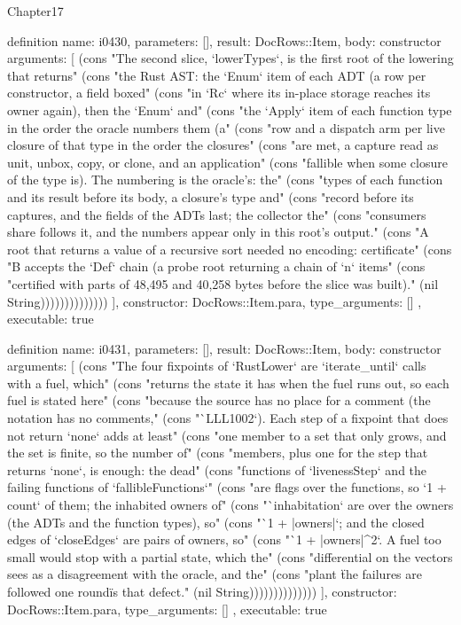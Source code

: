 \begin{lexlean}{Chapter17}
\begin{semanticmodule}
definition{
  name: i0430,
  parameters: [],
  result: DocRows::Item,
  body: constructor{
    arguments: [
      (cons "The second slice, `lowerTypes`, is the first root of the lowering that returns" (cons "the Rust AST: the `Enum` item of each ADT (a row per constructor, a field boxed" (cons "in `Rc` where its in-place storage reaches its owner again), then the `Enum` and" (cons "the `Apply` item of each function type in the order the oracle numbers them (a" (cons "row and a dispatch arm per live closure of that type in the order the closures" (cons "are met, a capture read as unit, unbox, copy, or clone, and an application" (cons "fallible when some closure of the type is). The numbering is the oracle's: the" (cons "types of each function and its result before its body, a closure's type and" (cons "record before its captures, and the fields of the ADTs last; the collector the" (cons "consumers share follows it, and the numbers appear only in this root's output." (cons "A root that returns a value of a recursive sort needed no encoding: certificate" (cons "B accepts the `Def` chain (a probe root returning a chain of `n` items" (cons "certified with parts of 48,495 and 40,258 bytes before the slice was built)." (nil String))))))))))))))
    ],
    constructor: DocRows::Item.para,
    type_arguments: []
  },
  executable: true
}

definition{
  name: i0431,
  parameters: [],
  result: DocRows::Item,
  body: constructor{
    arguments: [
      (cons "The four fixpoints of `RustLower` are `iterate_until` calls with a fuel, which" (cons "returns the state it has when the fuel runs out, so each fuel is stated here" (cons "because the source has no place for a comment (the notation has no comments," (cons "`LLL1002`). Each step of a fixpoint that does not return `none` adds at least" (cons "one member to a set that only grows, and the set is finite, so the number of" (cons "members, plus one for the step that returns `none`, is enough: the dead" (cons "functions of `livenessStep` and the failing functions of `fallibleFunctions`" (cons "are flags over the functions, so `1 + count` of them; the inhabited owners of" (cons "`inhabitation` are over the owners (the ADTs and the function types), so" (cons "`1 + |owners|`; and the closed edges of `closeEdges` are pairs of owners, so" (cons "`1 + |owners|^2`. A fuel too small would stop with a partial state, which the" (cons "differential on the vectors sees as a disagreement with the oracle, and the" (cons "plant \"the failures are followed one round\" is that defect." (nil String))))))))))))))
    ],
    constructor: DocRows::Item.para,
    type_arguments: []
  },
  executable: true
}


\end{semanticmodule}
\end{lexlean}
